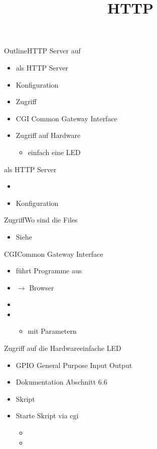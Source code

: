\documentclass{beamer}
\title{HTTP}
\begin{document}
\frame{\titlepage}
\begin{frame}{Outline}{HTTP Server auf \targetS}
 \begin{itemize}
  \item {} als HTTP Server
  \item Konfiguration
  \item Zugriff
  \item CGI Common Gateway Interface
  \item Zugriff auf Hardware 
  \begin{itemize}
   \item einfach eine LED
  \end{itemize}
 \end{itemize}
\end{frame}

\begin{frame}{ als HTTP Server}
 \begin{itemize}
  \item {}
  \item Konfiguration 
 \end{itemize}
\end{frame}

\begin{frame}{Zugriff}{Wo sind die Files}
 \begin{itemize}
  \item Siehe 
 \end{itemize}
\end{frame}

\begin{frame}{CGI}{Common Gateway Interface}
 \begin{itemize}
  \item führt Programme aus
  \item {} $\to$ Browser
  \item {}
  \item {}
  \begin{itemize}
   \item mit Parametern 
  \end{itemize}  
 \end{itemize}
\end{frame}

\begin{frame}{Zugriff auf die Hardware}{einfache LED}
 \begin{itemize}
  \item GPIO General Purpose Input Output
  \item Dokumentation  Abschnitt 6.6
  \item Skript 
  \item Starte Skript via cgi
  \begin{itemize}
   \item {}
   \item {}
  \end{itemize}
 \end{itemize}
\end{frame}
\end{document}
